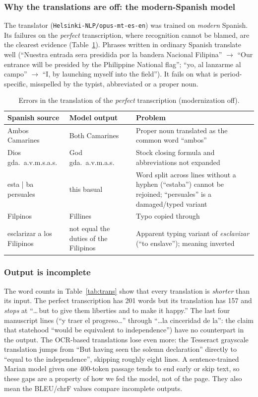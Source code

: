 \documentclass[10pt,twocolumn]{article}
\begin{document}
\subsubsection{Why the translations are off: the modern-Spanish model}
The translator (\texttt{Helsinki-NLP/opus-mt-es-en}) was trained on \emph{modern} Spanish. Its failures on the \emph{perfect} transcription, where recognition cannot be blamed, are the clearest evidence (Table~\ref{tab:examples}). Phrases written in ordinary Spanish translate well (``Nuestra entrada sera presidida por la bandera Nacional Filipina'' $\rightarrow$ ``Our entrance will be presided by the Philippine National flag''; ``yo, al lanzarme al campo'' $\rightarrow$ ``I, by launching myself into the field''). It fails on what is period-specific, misspelled by the typist, abbreviated or a proper noun.

\begin{table}[t]
\centering\footnotesize
\caption{Errors in the translation of the \emph{perfect} transcription (modernization off).}\label{tab:examples}
\setlength{\tabcolsep}{3pt}
\begin{tabular}{@{}p{}p{}p{}@{}}
\toprule
\textbf{Spanish source} & \textbf{Model output} & \textbf{Problem}\\
\midrule
Ambos Camarines & Both Camarines & Proper noun translated as the common word ``ambos''\\
Dios gda.\ a.v.m.s.a.s. & God gda.\ a.v.m.a.s. & Stock closing formula and abbreviations not expanded\\
esta | ba persuales & this basual & Word split across lines without a hyphen (``estaba'') cannot be rejoined; ``persuales'' is a damaged/typed variant\\
Filpinos & Fillines & Typo copied through\\
esclarizar a los Filipinos & not equal the duties of the Filipinos & Apparent typing variant of \emph{esclavizar} (``to enslave''); meaning inverted\\
\bottomrule
\end{tabular}
\end{table}

\subsubsection{Output is incomplete}
The word counts in Table~\ref{tab:trans} show that every translation is \emph{shorter} than its input. The perfect transcription has 201 words but its translation has 157 and \emph{stops} at ``\ldots\,but to give them liberties and to make it happy.'' The last four manuscript lines (``y traer el progreso\ldots'' through ``\ldots la cinceridad de la'': the claim that statehood ``would be equivalent to independence'') have no counterpart in the output. The OCR-based translations lose even more: the Tesseract grayscale translation jumps from ``But having seen the solemn declaration'' directly to ``equal to the independence'', skipping roughly eight lines. A sentence-trained Marian model given one 400-token passage tends to end early or skip text, so these gaps are a property of how we fed the model, not of the page. They also mean the BLEU/chrF values compare incomplete outputs.
\end{document}
